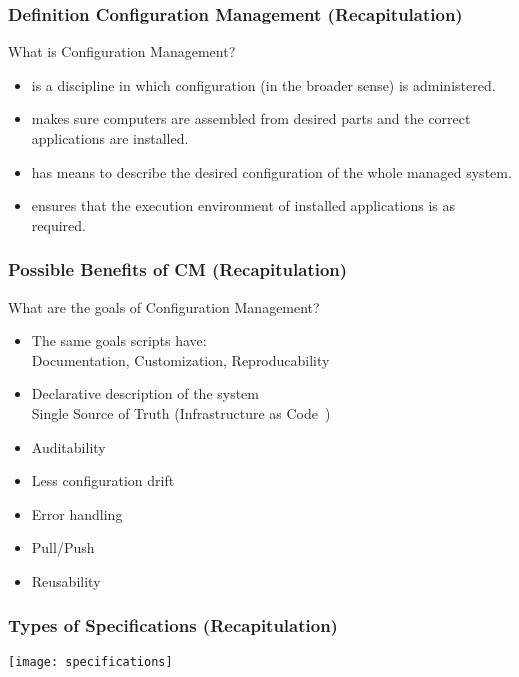 \begin{frame}
	\frametitle{Definition Configuration Management (Recapitulation)}

	\begin{task}
	What is Configuration Management?
	\end{task}

	\pause

	\begin{itemize}
	\item is a discipline in which configuration (in the broader sense) is administered.
	\item makes sure computers are assembled from desired parts and the correct applications are installed.
	\item has means to describe the desired configuration of the whole managed system.
	\item ensures that the execution environment of installed applications is as required.
	\end{itemize}
\end{frame}

\begin{frame}
	\frametitle{Possible Benefits of CM (Recapitulation)}

	\begin{task}
	What are the goals of Configuration Management?
	\end{task}

	\pause

	\begin{itemize} %
	\item The same goals scripts have: \\
		Documentation, Customization, Reproducability
	\item Declarative description of the system \\
		Single Source of Truth 
		(Infrastructure as Code~\cite{waldemar2013testing})
	\item Auditability
	\item Less configuration drift
	\item Error handling
	\item Pull/Push
	\item Reusability
	\end{itemize}
\end{frame}

\begin{frame}
	\frametitle{Types of Specifications (Recapitulation)}

	\texttt{[image: specifications]}
\end{frame}


